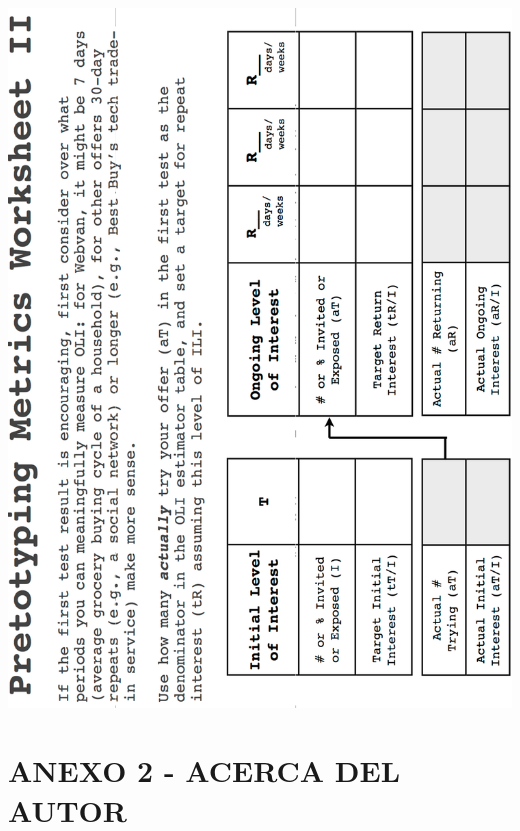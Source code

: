 \documentclass{article}
\begin{document}
\begin{center}
    \includegraphics[width=1.1\textwidth]{metrics_2.png}
\end{center}
\clearpage

\section{ANEXO 2 - ACERCA DEL AUTOR}
\end{document}
